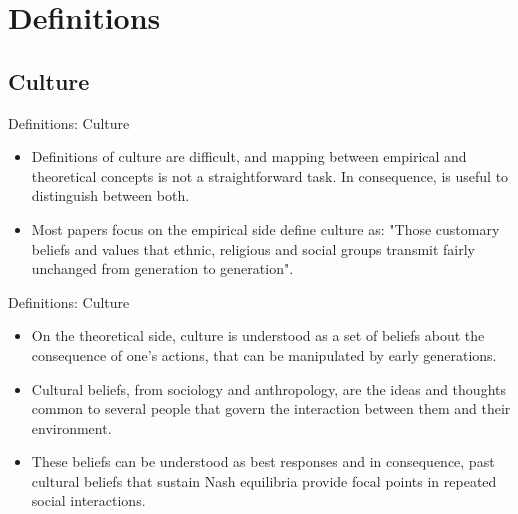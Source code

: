 \documentclass{beamer}
\begin{document}
\section{Definitions}
\subsection{Culture}
    \begin{frame}{Definitions: Culture}
    \begin{itemize}
        \item  Definitions of culture are difficult, and mapping between empirical and theoretical concepts is not a straightforward task. In consequence, is useful to distinguish between both.
 \vspace{0.5cm} 
                   \pause 

 \item Most papers focus on the empirical side define culture as: "Those customary beliefs and values that ethnic, religious and social groups transmit fairly unchanged from generation to generation".               
            \end{itemize}
    \end{frame}

        \begin{frame}{Definitions: Culture}
    \begin{itemize}
        \item On the theoretical side, culture is understood as a set of beliefs about the consequence of one's actions, that can be manipulated by early generations.
         \vspace{0.3cm}
        \pause 
        \item Cultural beliefs, from sociology and anthropology, are the ideas and thoughts common to several people that govern the interaction between them and their environment.
                 \vspace{0.3cm}
        \pause 
        \item These beliefs can be understood as best responses and in consequence, past cultural beliefs that sustain Nash equilibria provide focal points in repeated social interactions.

            \end{itemize}
    \end{frame}
\end{document}
